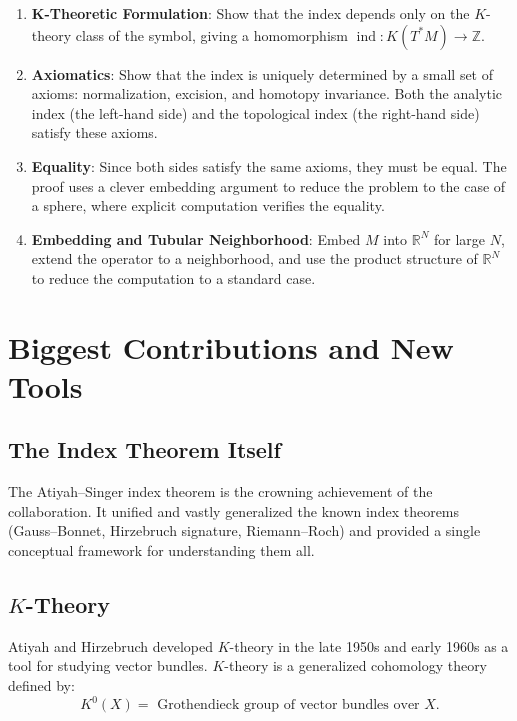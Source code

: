 \begin{enumerate}
\item \textbf{K-Theoretic Formulation}: Show that the index depends only on the $K$-theory class of the symbol, giving a homomorphism $\operatorname{ind}: K(T^*M) \to \mathbb{Z}$.

\item \textbf{Axiomatics}: Show that the index is uniquely determined by a small set of axioms: normalization, excision, and homotopy invariance. Both the analytic index (the left-hand side) and the topological index (the right-hand side) satisfy these axioms.

\item \textbf{Equality}: Since both sides satisfy the same axioms, they must be equal. The proof uses a clever embedding argument to reduce the problem to the case of a sphere, where explicit computation verifies the equality.

\item \textbf{Embedding and Tubular Neighborhood}: Embed $M$ into $\mathbb{R}^N$ for large $N$, extend the operator to a neighborhood, and use the product structure of $\mathbb{R}^N$ to reduce the computation to a standard case.
\end{enumerate}

\section{Biggest Contributions and New Tools}

\subsection{The Index Theorem Itself}

The Atiyah--Singer index theorem is the crowning achievement of the collaboration. It unified and vastly generalized the known index theorems (Gauss--Bonnet, Hirzebruch signature, Riemann--Roch) and provided a single conceptual framework for understanding them all.

\subsection{$K$-Theory}

Atiyah and Hirzebruch developed $K$-theory in the late 1950s and early 1960s as a tool for studying vector bundles. $K$-theory is a generalized cohomology theory defined by:
\[
K^0(X) = \text{ Grothendieck group of vector bundles over } X.
\]


